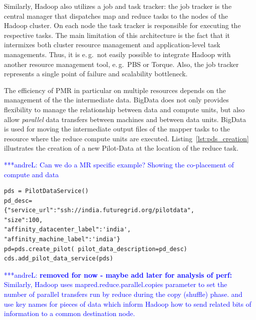 \documentclass{acm_proc_article-sp}
\newcommand{\alnote}[1]{ {\textcolor{blue} { ***andreL: #1 }}}
\newcommand{\alnote}[1]{}
\newcommand{\pilotmapreduce}{Pilot-MapReduce\xspace}
\begin{document}
Similarly, Hadoop also utilizes a job and task tracker: the job tracker is the
central manager that dispatches map and reduce tasks to the nodes of the
Hadoop cluster. On each node the task tracker is responsible for executing the
respective tasks. The main limitation of this architecture is the fact that it
intermixes both cluster resource management and application-level task
managements. Thus, it is e.\,g.\ not easily possible to integrate Hadoop with
another resource management tool, e.\,g.\ PBS or Torque. Also, the job tracker
represents a single point of failure and scalability bottleneck.


The efficiency of PMR in particular on multiple resources depends on the
management of the the intermediate data. BigData does not only provides
flexibility to manage the relationship between data and compute units, but also
allow {\it parallel} data transfers between machines and between data units.
BigData is used for moving the intermediate output files of the mapper tasks to
the resource where the reduce compute units are executed.
Listing~\ref{lst:pds_creation} illustrates the creation of a new Pilot-Data at
the location of the reduce task.


\alnote{Can we do a MR specific example? Showing the co-placement of compute and 
data}

\lstset{
language=Python,
frame=single,
captionpos=b,
stringstyle=\ttfamily,
basicstyle=\scriptsize\ttfamily
}
\noindent\begin{minipage}{0.47 \textwidth}
\begin{lstlisting}[caption={\textbf{Pilot Data Creation:} Instantiation of a Pilot Data using Pilot Data Description}, label={lst:pds_creation}]
pds = PilotDataService()
pd_desc=
{"service_url":"ssh://india.futuregrid.org/pilotdata",
"size":100,
"affinity_datacenter_label":'india',
"affinity_machine_label":'india'}
pd=pds.create_pilot( pilot_data_description=pd_desc)
cds.add_pilot_data_service(pds)
\end{lstlisting}
\end{minipage}

\alnote{\textbf{removed for now - maybe add later for analysis of perf:} Similarly, Hadoop uses mapred.reduce.parallel.copies parameter to set
the number of parallel transfers run by reduce during the
copy (shuffle) phase.  and use key names for pieces of data which
inform Hadoop how to send related bits of information to a common
destination node.}
\end{document}
